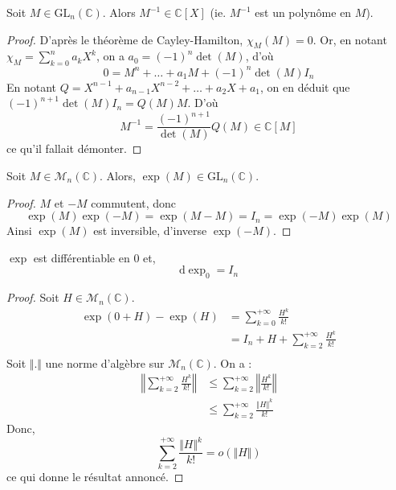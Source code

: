 





	
	\begin{lemma}
		\label{surjectivite-de-l-exponentielle-1}
		Soit $M \in \mathrm{GL}_n(\mathbb{C})$. Alors $M^{-1} \in \mathbb{C}[X]$ (ie. $M^{-1}$ est un polynôme en $M$).
	\end{lemma}
	
	\begin{proof}
		D'après le théorème de Cayley-Hamilton, $\chi_M(M) = 0$. Or, en notant $\chi_M = \sum_{k=0}^n a_k X^k$, on a $a_0 = (-1)^n \det(M)$, d'où
		\[ 0 = M^n + \dots + a_1 M + (-1)^n \det(M) I_n \]
		En notant $Q = X^{n-1} + a_{n-1}X^{n-2} + \dots + a_2 X + a_1$, on en déduit que $(-1)^{n+1} \det(M) I_n = Q(M)M$. D'où
		\[ M^{-1} = \frac{(-1)^{n+1}}{\det(M)} Q(M) \in \mathbb{C}[M] \]
		ce qu'il fallait démonter.
	\end{proof}
	
	\begin{lemma}
		\label{surjectivite-de-l-exponentielle-2}
		Soit $M \in \mathcal{M}_n(\mathbb{C})$. Alors, $\exp(M) \in \mathrm{GL}_n(\mathbb{C})$.
	\end{lemma}
	
	\begin{proof}
		$M$ et $-M$ commutent, donc
		\[ \exp(M)\exp(-M) = \exp(M-M) = I_n = \exp(-M)\exp(M) \]
		Ainsi $\exp(M)$ est inversible, d'inverse $\exp(-M)$.
	\end{proof}
	
	\begin{lemma}
		\label{surjectivite-de-l-exponentielle-3}
		$\exp$ est différentiable en $0$ et,
		\[ \mathrm{d}\exp_0 = I_n \]
	\end{lemma}
	
	\begin{proof}
		Soit $H \in \mathcal{M}_n(\mathbb{C})$.
		\begin{align*}
			\exp(0+H) - \exp(H) &= \sum_{k=0}^{+\infty} \frac{H^k}{k!} \\
			&= I_n + H + \sum_{k=2}^{+\infty} \frac{H^k}{k!} \\
		\end{align*}
		Soit $\Vert . \Vert$ une norme d'algèbre sur $\mathcal{M}_n(\mathbb{C})$. On a :
		\begin{align*}
			\left\Vert \sum_{k=2}^{+\infty} \frac{H^k}{k!} \right\Vert &\leq \sum_{k=2}^{+\infty} \left\Vert \frac{H^k}{k!} \right\Vert \\
			&\leq \sum_{k=2}^{+\infty} \frac{\Vert H \Vert^k}{k!}
		\end{align*}
		Donc,
		\[ \sum_{k=2}^{+\infty} \frac{\Vert H \Vert^k}{k!} = o(\Vert H \Vert) \]
		ce qui donne le résultat annoncé.
	\end{proof}
	

